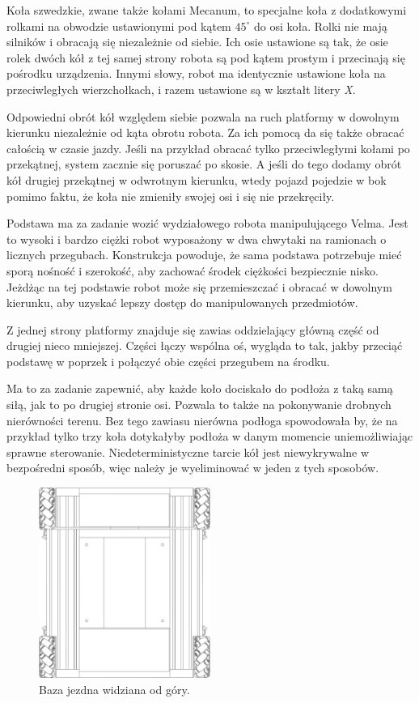 Koła szwedzkie, zwane także kołami Mecanum, to specjalne koła z dodatkowymi rolkami na obwodzie ustawionymi pod kątem $45^\circ$ do osi koła.
Rolki nie mają silników i obracają się niezależnie od siebie.
Ich osie ustawione są tak, że osie rolek dwóch kół z tej samej strony robota są pod kątem prostym i przecinają się pośrodku urządzenia.
Innymi słowy, robot ma identycznie ustawione koła na przeciwległych wierzchołkach, i razem ustawione są w kształt litery \emph{X}.

Odpowiedni obrót kół względem siebie pozwala na ruch platformy w dowolnym kierunku niezależnie od kąta obrotu robota.
Za ich pomocą da się także obracać całością w czasie jazdy.
Jeśli na przykład obracać tylko przeciwległymi kołami po przekątnej, system zacznie się poruszać po skosie.
A jeśli do tego dodamy obrót kół drugiej przekątnej w odwrotnym kierunku, wtedy pojazd pojedzie w bok pomimo faktu, że koła nie zmieniły swojej osi i się nie przekręciły.

Podstawa ma za zadanie wozić wydziałowego robota manipulującego Velma.
Jest to wysoki i bardzo ciężki robot wyposażony w dwa chwytaki na ramionach o licznych przegubach.
Konstrukcja powoduje, że sama podstawa potrzebuje mieć sporą nośność i szerokość, aby zachować środek ciężkości bezpiecznie nisko.
Jeżdżąc na tej podstawie robot może się przemieszczać i obracać w dowolnym kierunku, aby uzyskać lepszy dostęp do manipulowanych przedmiotów.

Z jednej strony platformy znajduje się zawias oddzielający główną część od drugiej nieco mniejszej.
Części łączy wspólna oś, wygląda to tak, jakby przeciąć podstawę w poprzek i połączyć obie części przegubem na środku.

Ma to za zadanie zapewnić, aby każde koło dociskało do podłoża z taką samą siłą, jak to po drugiej stronie osi.
Pozwala to także na pokonywanie drobnych nierówności terenu.
Bez tego zawiasu nierówna podłoga spowodowała by, że na przykład tylko trzy koła dotykałyby podłoża w danym momencie uniemożliwiając sprawne sterowanie.
Niedeterministyczne tarcie kół jest niewykrywalne w bezpośredni sposób, więc należy je wyeliminować w jeden z tych sposobów.

\begin{figure}
\centering
 \includegraphics[width=0.5\textwidth]{graphics/base_top.pdf}
\caption{Baza jezdna widziana od góry.}
\end{figure} 

